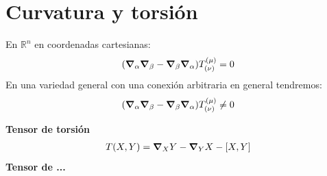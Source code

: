 \documentclass{article}
\newcommand{\caja}[3]{%
  \begin{tcolorbox}[colback=#1!5!white,colframe=#1!25!black,title=#2]
    #3
  \end{tcolorbox}%
}
\begin{document}
\section{Curvatura y torsión }
En $ \mathbb{R}^ {n } $ en coordenadas cartesianas: 
\begin{gather*}
  (\grad _\alpha \grad _{\beta}  - \grad _\beta \grad_\alpha) T _{(\nu )} ^ {(\mu )} = 0  
\end{gather*}
En una variedad general con una conexión arbitraria en general tendremos: 
\begin{gather*}
  (\grad _\alpha \grad _{\beta}  - \grad _\beta \grad_\alpha) T _{(\nu )} ^ {(\mu )} \neq 0  
\end{gather*}

\caja{green}{}{
  \textbf{Tensor de torsión }
  \begin{gather*}
    T(X,Y) = \grad_X Y - \grad_Y X - [X,Y] 
  \end{gather*}
  \textbf{Tensor de ...}
}
\end{document}
